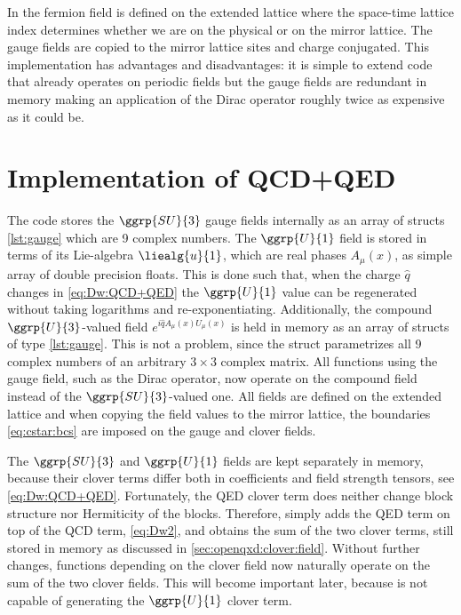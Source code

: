 In \openqxd the fermion field is defined on the extended lattice where the space-time lattice index determines whether we are on the physical or on the mirror lattice.
The gauge fields are copied to the mirror lattice sites and charge conjugated.
This implementation has advantages and disadvantages:
it is simple to extend code that already operates on periodic fields but the gauge fields are redundant in memory making an application of the Dirac operator roughly twice as expensive as it could be. %

\section{Implementation of QCD+QED}
\label{sec:openqxd:qcd+qed}

The code stores the $\ggrp{SU}{3}$ gauge fields internally as an array of structs \cref{lst:gauge} which are \num{9} complex numbers.
The $\ggrp{U}{1}$ field is stored in terms of its Lie-algebra $\liealg{u}{1}$, which are real phases $A_{\mu}(x)$, as simple array of double precision floats.
This is done such that, when the charge $\hat{q}$ changes in \cref{eq:Dw:QCD+QED} the $\ggrp{U}{1}$ value can be regenerated without taking logarithms and re-exponentiating.
Additionally, the compound $\ggrp{U}{3}$-valued field $e^{i \hat{q} A_{\mu}(x) U_{\mu}(x)}$ is held in memory as an array of structs of type \cref{lst:gauge}.
This is not a problem, since the  struct parametrizes all \num{9} complex numbers of an arbitrary $3 \times 3$ complex matrix.
All functions using the gauge field, such as the Dirac operator, now operate on the compound field instead of the $\ggrp{SU}{3}$-valued one.
All fields are defined on the extended lattice and when copying the field values to the mirror lattice, the boundaries \cref{eq:cstar:bcs} are imposed on the gauge and clover fields.

The $\ggrp{SU}{3}$ and $\ggrp{U}{1}$ fields are kept separately in memory, because their clover terms differ both in coefficients and field strength tensors, see \cref{eq:Dw:QCD+QED}.
Fortunately, the QED clover term does neither change block structure nor Hermiticity of the blocks.
Therefore, \openqxd simply adds the QED term on top of the QCD term, \cref{eq:Dw2}, and obtains the sum of the two clover terms, still stored in memory as discussed in \cref{sec:openqxd:clover:field}.
Without further changes, functions depending on the clover field now naturally operate on the sum of the two clover fields.
This will become important later, because \quda is not capable of generating the $\ggrp{U}{1}$ clover term.

